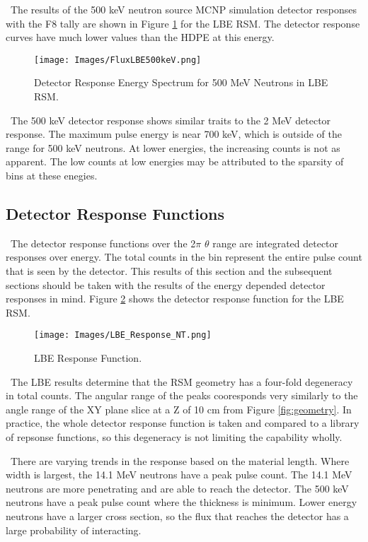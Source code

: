 \documentclass[journal]{IEEEtran}
\let\MYoriglatexcaption\caption
\renewcommand{\caption}[2][\relax]{\MYoriglatexcaption[#2]{#2}}
\begin{document}
    \ The results of the 500 keV neutron source MCNP simulation detector responses with the F8 tally are shown in Figure \ref{fig:ESpec3} for the LBE RSM. The detector response curves have much lower values than the HDPE at this energy. 
	
	\begin{figure}[ht]
		\texttt{[image: Images/FluxLBE500keV.png]}
		\centering
		\caption{Detector Response Energy Spectrum for 500 MeV Neutrons in LBE RSM.}
		\label{fig:ESpec3}
	\end{figure}
	
	\ The 500 keV detector response shows similar traits to the 2 MeV detector response.  The maximum pulse energy is near 700 keV, which is outside of the range for 500 keV neutrons. At lower energies, the increasing counts is not as apparent.  The low counts at low energies may be attributed to the sparsity of bins at these enegies. 
	
	\subsection{Detector Response Functions}
	
	\ The detector response functions over the 2$\pi$ $\theta$ range are integrated detector responses over energy. The total counts in the bin represent the entire pulse count that is seen by the detector.  This results of this section and the subsequent sections should be taken with the results of the energy depended detector responses in mind.  Figure \ref{fig:LBE_Response} shows the detector response function for the LBE RSM.
	
	\begin{figure}[ht]
		\texttt{[image: Images/LBE\_Response\_NT.png]}
		\centering
		\caption{LBE Response Function.}
		\label{fig:LBE_Response}
	\end{figure}

    \ The LBE results determine that the RSM geometry has a four-fold degeneracy in total counts.  The angular range of the peaks cooresponds very similarly to the angle range of the XY plane slice at a Z of 10 cm from Figure \ref{fig:geometry}.  In practice, the whole detector response function is taken and compared to a library of repsonse functions, so this degeneracy is not limiting the capability wholly. 
    
    \ There are varying trends in the response based on the material length.  Where width is largest, the 14.1 MeV neutrons have a peak pulse count.  The 14.1 MeV neutrons are more penetrating and are able to reach the detector. The 500 keV neutrons have a peak pulse count where the thickness is minimum.  Lower energy neutrons have a larger cross section, so the flux that reaches the detector has a large probability of interacting. 
\end{document}
